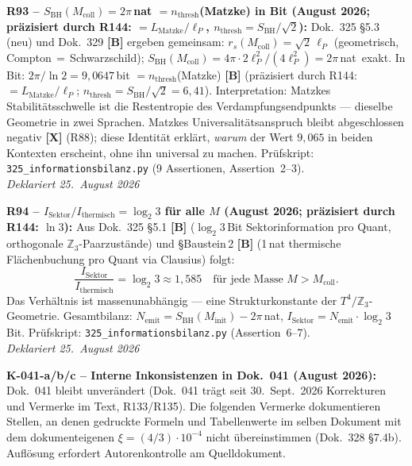 \textbf{R93 -- $S_\mathrm{BH}(M_\mathrm{coll}) = 2\pi$\,nat $= n_\mathrm{thresh}$(Matzke) in Bit (August 2026; präzisiert durch R144: $= L_\mathrm{Matzke}/\ell_P$, $n_\mathrm{thresh} = S_\mathrm{BH}/\sqrt{2}$):}
Dok.~325 §5.3 (neu) und Dok.~329 \textbf{[B]} ergeben gemeinsam:
$r_s(M_\mathrm{coll}) = \sqrt{2}\,\ell_P$ (geometrisch, Compton\,$=$\,Schwarzschild);
$S_\mathrm{BH}(M_\mathrm{coll}) = 4\pi\cdot 2\ell_P^2/(4\ell_P^2) = 2\pi$\,nat~exakt.
In Bit: $2\pi/\ln 2 = 9{,}0647$\,bit $= n_\mathrm{thresh}$(Matzke) \textbf{[B]} (präzisiert durch R144: $=L_\mathrm{Matzke}/\ell_P$; $n_\mathrm{thresh}=S_\mathrm{BH}/\sqrt{2}=6{,}41$).
Interpretation: Matzkes Stabilitätsschwelle ist die Restentropie des
Verdampfungsendpunkts --- dieselbe Geometrie in zwei Sprachen.
Matzkes Universalitätsanspruch bleibt abgeschlossen negativ \textbf{[X]} (R88);
diese Identität erklärt, \emph{warum} der Wert $9{,}065$ in beiden Kontexten erscheint,
ohne ihn universal zu machen.
Prüfskript: \texttt{325\_informationsbilanz.py} (9 Assertionen, Assertion~2--3).\\
\emph{Deklariert 25.~August 2026}

\medskip

\textbf{R94 -- $I_\mathrm{Sektor}/I_\mathrm{thermisch} = \log_2 3$ für alle $M$ (August 2026; präzisiert durch R144: $\ln 3$):}
Aus Dok.~325 §5.1 \textbf{[B]} ($\log_2 3$\,Bit Sektorinformation pro Quant,
orthogonale $\mathbb{Z}_3$-Paarzustände) und §Baustein\,2 \textbf{[B]}
(1\,nat thermische Flächenbuchung pro Quant via Clausius) folgt:
\begin{equation*}
  \frac{I_\mathrm{Sektor}}{I_\mathrm{thermisch}} = \log_2 3 \approx 1{,}585
  \quad\text{für jede Masse $M > M_\mathrm{coll}$.}
\end{equation*}
Das Verhältnis ist massenunabhängig --- eine Strukturkonstante der
$T^4/\mathbb{Z}_3$-Geometrie. Gesamtbilanz:
$N_\mathrm{emit} = S_\mathrm{BH}(M_\mathrm{init}) - 2\pi$\,nat,
$I_\mathrm{Sektor} = N_\mathrm{emit}\cdot\log_2 3$\,Bit.
Prüfskript: \texttt{325\_informationsbilanz.py} (Assertion~6--7).\\
\emph{Deklariert 25.~August 2026}

\medskip

\textbf{K-041-a/b/c -- Interne Inkonsistenzen in Dok.~041 (August 2026):}
Dok.~041 bleibt unverändert (Dok.~041 trägt seit 30.~Sept.~2026 Korrekturen und Vermerke im Text, R133/R135). Die folgenden Vermerke dokumentieren
Stellen, an denen gedruckte Formeln und Tabellenwerte im selben Dokument
mit dem dokumenteigenen $\xi = (4/3)\cdot10^{-4}$ nicht übereinstimmen
(Dok.~328 §7.4b). Auflösung erfordert Autorenkontrolle am Quelldokument.

